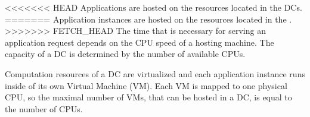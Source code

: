
<<<<<<< HEAD
Applications are hosted on the resources located in the \ac{DC}s.
=======
Application instances are hosted on the resources located in the \dcs{}.
>>>>>>> FETCH_HEAD
The time that is necessary for serving an application request depends on the CPU speed of a hosting machine.
The capacity of a \ac{DC} is determined by the number of available CPUs. 


Computation resources of a \ac{DC} are virtualized and each application instance runs inside of its own Virtual Machine (VM). Each VM is mapped to one physical CPU, so the maximal number of VMs, that can be hosted in a \ac{DC}, is equal to the number of CPUs.

